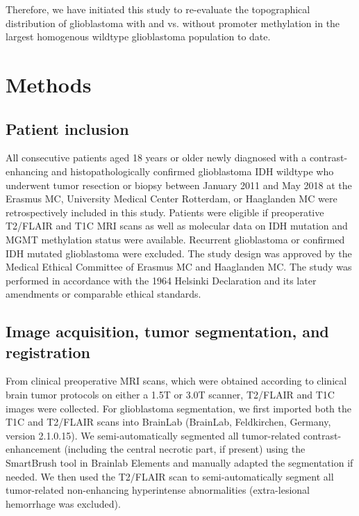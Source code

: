 Therefore, we have initiated this study to re-evaluate the topographical distribution of glioblastoma with and vs. without  promoter methylation in the largest homogenous  wildtype glioblastoma population to date.

\section{Methods}
\subsection{Patient inclusion}

All consecutive patients aged 18 years or older newly diagnosed with a contrast-enhancing and histopathologically confirmed glioblastoma \gls{IDH} wildtype who underwent tumor resection or biopsy between January 2011 and May 2018 at the Erasmus MC, University Medical Center Rotterdam, or Haaglanden MC were retrospectively included in this study.
Patients were eligible if preoperative \gls{T2}/\gls{FLAIR} and \gls{T1C} \gls{MRI} scans as well as molecular data on \gls{IDH} mutation and \gls{MGMT} methylation status were available.
Recurrent glioblastoma or confirmed \gls{IDH} mutated glioblastoma were excluded.
The study design was approved by the Medical Ethical Committee of Erasmus MC and Haaglanden MC.
The study was performed in accordance with the 1964 Helsinki Declaration and its later amendments or comparable ethical standards.

\subsection{Image acquisition, tumor segmentation, and registration}
From clinical preoperative \gls{MRI} scans, which were obtained according to clinical brain tumor protocols on either a 1.5T or 3.0T scanner, \gls{T2}/\gls{FLAIR} and \gls{T1C} images were collected.
For glioblastoma segmentation, we first imported both the \gls{T1C} and \gls{T2}/\gls{FLAIR} scans into BrainLab (BrainLab, Feldkirchen, Germany, version 2.1.0.15).
We semi-automatically segmented all tumor-related contrast-enhancement (including the central necrotic part, if present) using the SmartBrush tool in Brainlab Elements and manually adapted the segmentation if needed.
We then used the \gls{T2}/\gls{FLAIR} scan to semi-automatically segment all tumor-related non-enhancing hyperintense abnormalities (extra-lesional hemorrhage was excluded).

